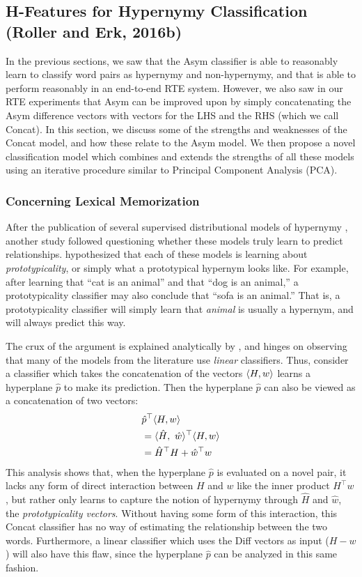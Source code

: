 \documentclass[12pt]{article}
\begin{document}
\subsection{H-Features for Hypernymy Classification (Roller and Erk, 2016b)}
\label{sec:hfeatures}

In the previous sections, we saw that the Asym classifier is able to reasonably
learn to classify word pairs as hypernymy and non-hypernymy, and that is able
to perform reasonably in an end-to-end RTE system. However, we also saw in our
RTE experiments that Asym can be improved upon by simply concatenating the Asym
difference vectors with vectors for the LHS and the RHS (which we call Concat).
In this section, we discuss some of the strengths and weaknesses of the Concat
model, and how these relate to the Asym model. We then propose a novel
classification model which combines and extends the strengths of all these
models using an iterative procedure similar to Principal Component Analysis
(PCA).

\subsubsection{Concerning Lexical Memorization}
\label{sec:lexmem}

After the publication of several supervised distributional models of hypernymy
\cite{baroni:2011:gems,fu:2014:acl,roller:2014:coling,weeds:2014:coling},
another study followed questioning whether these models truly learn to predict
relationships.  hypothesized that each of these models
is learning about {\em prototypicality}, or simply what a prototypical
hypernym looks like. For example, after learning that ``cat is an animal''
and that ``dog is an animal,'' a prototypicality classifier may also conclude
that ``sofa is an animal.'' That is, a prototypicality classifier will
simply learn that {\em animal} is usually a hypernym, and will always
predict this way.

The crux of the argument is explained analytically by
, and hinges on observing that many of the models from
the literature use {\em linear} classifiers. Thus, consider a
classifier which takes the concatenation of the vectors $\langle H, w\rangle$ learns a
hyperplane $\hat p$ to make its prediction. Then the hyperplane $\hat p$ can
also be viewed as a concatenation of two vectors:
\begin{align*}
  & \hat p^\top \langle H, w\rangle\\
  & = \langle \hat H,~\hat w\rangle^\top \langle H, w\rangle\\
  & = \hat H^\top H + \hat w^\top w
\end{align*}
This analysis shows that, when the hyperplane $\hat p$ is evaluated on a novel
pair, it lacks any form of direct interaction between $H$ and $w$ like the
inner product $H^\top w$, but rather only learns to capture the notion of
hypernymy through $\hat H$ and $\hat w$, the {\em prototypicality vectors}.
Without having some form of this interaction, this Concat classifier has no way
of estimating the relationship between the two words. Furthermore, a linear classifier
which uses the Diff vectors as input ($H - w$) will also have this flaw,
since the hyperplane $\hat p$ can be analyzed in this same fashion.
\end{document}
